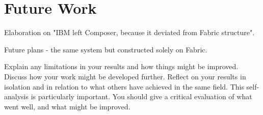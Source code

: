 \documentclass[a4paper,11pt]{report}
\begin{document}
\section{Future Work}

\label{conclusion-future}

Elaboration on "IBM left Composer, because it deviated from Fabric structure".

Future plans - the same system but constructed solely on Fabric.


Explain any limitations in your results and how things might be improved.
Discuss how your work might be developed further. Reflect on your results in
isolation and in relation to what others have achieved in the same field. This
self-analysis is particularly important. You should give a critical evaluation
of what went well, and what might be improved.







\appendix
\end{document}
